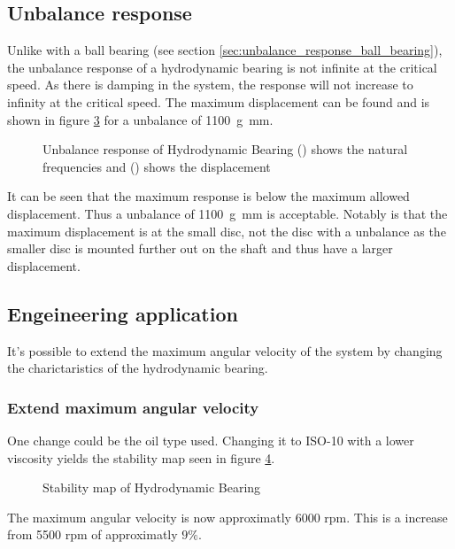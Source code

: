 \subsection{Unbalance response}
Unlike with a ball bearing (see section \ref{sec:unbalance_response_ball_bearing}), the unbalance response of a hydrodynamic bearing is not infinite at the critical speed. As there is damping in the system, the response will not increase to infinity at the critical speed. The maximum displacement can be found and is shown in figure \ref{fig:hydrodynamic_bearing_unbalance_response} for a unbalance of \SI{1100}{\gram \milli \meter}.
%    

\begin{figure}[ht]
\begin{subfigure}[t]{0.49\textwidth}
    \centering
    
    \caption{}
    \label{fig:hydrodynamic_bearing_unbalance_response_natural}
\end{subfigure}
\hfill
\begin{subfigure}[t]{0.49\textwidth}
    \centering
    
    \caption{}
    \label{fig:hydrodynamic_bearing_unbalance_response_disp}
\end{subfigure}
\caption{Unbalance response of Hydrodynamic Bearing () shows the natural frequencies and () shows the displacement}
\label{fig:hydrodynamic_bearing_unbalance_response}
\end{figure}

It can be seen that the maximum response is below the maximum allowed displacement. Thus a unbalance of \SI{1100}{\gram \milli \meter} is acceptable. Notably is that the maximum displacement is at the small disc, not the disc with a unbalance as the smaller disc is mounted further out on the shaft and thus have a larger displacement.

\subsection{Engeineering application}
It's possible to extend the maximum angular velocity of the system by changing the charictaristics of the hydrodynamic bearing.

\subsubsection{Extend maximum angular velocity}
One change could be the oil type used. Changing it to ISO-10 with a lower viscosity yields the stability map seen in figure \ref{fig:hydrodynamic_bearing_stability_map}.
\begin{figure}[ht]
    \centering
    
    \caption{Stability map of Hydrodynamic Bearing}
    \label{fig:hydrodynamic_bearing_stability_map}
\end{figure}
The maximum angular velocity is now approximatly 6000 rpm. This is a increase from 5500 rpm of approximatly $9 \%$.